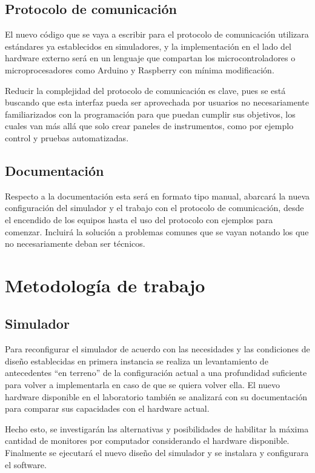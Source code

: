 \subsection{Protocolo de comunicación}

El nuevo código que se vaya a escribir para el protocolo de comunicación utilizara estándares ya establecidos en simuladores, y la implementación en el lado del hardware externo será en un lenguaje que compartan los microcontroladores o microprocesadores como Arduino y Raspberry con mínima modificación.

Reducir la complejidad del protocolo de comunicación es clave, pues se está buscando que esta interfaz pueda ser aprovechada por usuarios no necesariamente familiarizados con la programación para que puedan cumplir sus objetivos, los cuales van más allá que solo crear paneles de instrumentos, como por ejemplo control y pruebas automatizadas.

\subsection{Documentación}

Respecto a la documentación esta será en formato tipo manual, abarcará la nueva configuración del simulador y el trabajo con el protocolo de comunicación, desde el encendido de los equipos hasta el uso del protocolo con ejemplos para comenzar. Incluirá la solución a problemas comunes que se vayan notando los que no necesariamente deban ser técnicos.

\section{Metodología de trabajo}

\subsection{Simulador}

Para reconfigurar el simulador de acuerdo con las necesidades y las condiciones de diseño establecidas en primera instancia se realiza un levantamiento de antecedentes “en terreno” de la configuración actual a una profundidad suficiente para volver a implementarla en caso de que se quiera volver ella. El nuevo hardware disponible en el laboratorio también se analizará con su documentación para comparar sus capacidades con el hardware actual.

Hecho esto, se investigarán las alternativas y posibilidades de habilitar la máxima cantidad de monitores por computador considerando el hardware disponible. Finalmente se ejecutará el nuevo diseño del simulador y se instalara y configurara el software.

